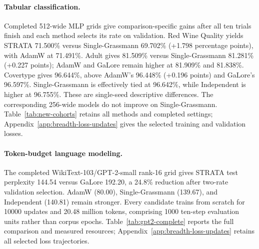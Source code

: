 \paragraph{Tabular classification.} Completed 512-wide MLP grids give comparison-specific gains after all ten trials finish and each method selects its rate on validation. Red Wine Quality yields STRATA 71.500\% versus Single-Grassmann 69.702\% (+1.798 percentage points), with AdamW at 71.491\%. Adult gives 81.509\% versus Single-Grassmann 81.281\% (+0.227 points); AdamW and GaLore remain higher at 81.909\% and 81.838\%. Covertype gives 96.644\%, above AdamW's 96.448\% (+0.196 points) and GaLore's 96.597\%. Single-Grassmann is effectively tied at 96.642\%, while Independent is higher at 96.755\%. These are single-seed descriptive differences. The corresponding 256-wide models do not improve on Single-Grassmann. Table~\ref{tab:new-cohorts} retains all methods and completed settings; Appendix~\ref{app:breadth-loss-updates} gives the selected training and validation losses.

\paragraph{Token-budget language modeling.} The completed WikiText-103/GPT-2-small rank-16 grid gives STRATA test perplexity 144.54 versus GaLore 192.20, a 24.8\% reduction after two-rate validation selection. AdamW (80.00), Single-Grassmann (139.67), and Independent (140.81) remain stronger. Every candidate trains from scratch for 10000 updates and 20.48 million tokens, comprising 1000 ten-step evaluation units rather than corpus epochs. Table~\ref{tab:gpt2-complete} reports the full comparison and measured resources; Appendix~\ref{app:breadth-loss-updates} retains all selected loss trajectories.


